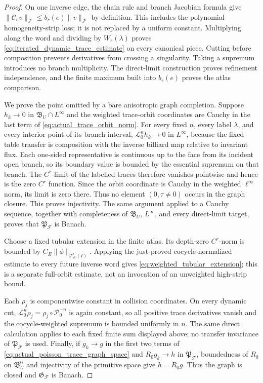 \documentclass[11pt]{amsart}
\theoremstyle{compactplain}
\theoremstyle{compactdefinition}
\theoremstyle{compactremark}
\newcommand{\Ltransfer}{\mathscr L}
\newcommand{\Pcal}{\mathcal P}
\begin{document}
\begin{proof}
On one inverse edge, the chain rule and branch Jacobian formula give
\(\|\mathcal C_ev\|_{J^r}\le b_r(e)\|v\|_{J^r}\) by definition.  This
includes the polynomial homogeneity-strip loss; it is not replaced by a
uniform constant.  Multiplying along the word and dividing by
\(W_r(\lambda)\) proves \eqref{eq:iterated_dynamic_trace_estimate} on every
canonical piece.  Cutting before composition prevents derivatives from
crossing a singularity.  Taking a supremum introduces no branch multiplicity.
The direct-limit construction proves refinement independence, and the finite
maximum built into \(b_r(e)\) proves the atlas comparison.

We prove the point omitted by a bare anisotropic graph completion.  Suppose
\(h_k\to0\) in \(\mathfrak B_U\cap L^\infty\) and the weighted trace-orbit
coordinates are Cauchy in the last term of
\eqref{eq:actual_trace_orbit_norm}.  For every fixed \(n\), every label
\(\lambda\), and every interior point of its branch interval,
\(\Ltransfer_0^nh_k\to0\) in \(L^\infty\), because the fixed-table transfer is
composition with the inverse billiard map relative to invariant flux.  Each
one-sided representative is continuous up to the face from its incident open
branch, so its boundary value is bounded by the essential supremum on that
branch.  The \(C^r\)-limit of the labelled traces therefore vanishes pointwise and hence is
the zero \(C^r\) function.  Since the orbit coordinate is Cauchy in the
weighted \(\ell^\infty\) norm, its limit is zero there.  Thus no element
\((0,\tau\ne0)\) occurs in the graph closure.  This proves injectivity.
The same argument applied to a Cauchy sequence, together with completeness of
\(\mathfrak B_U\), \(L^\infty\), and every direct-limit target, proves that
\(\mathfrak P_{\mathscr F}\) is Banach.

Choose a fixed tubular extension in the finite atlas.  Its depth-zero
\(C^r\)-norm is bounded by \(C_E\|\phi\|_{\mathcal T_K^r(I)}\).
Applying the just-proved cocycle-normalized estimate to every future inverse
word gives \eqref{eq:weighted_tubular_extension}; this is a separate full-orbit
estimate, not an invocation of an unweighted high-strip bound.

Each \(\rho_j\) is componentwise constant in collision coordinates.  On every
dynamic cut, \(\Ltransfer_0^n\rho_j=\rho_j\circ\Pcal_0^{-n}\) is again
constant, so all positive trace derivatives vanish and the cocycle-weighted
supremum is bounded uniformly in \(n\).  The same direct calculation applies
to each fixed finite sum displayed above; no transfer invariance of
\(\mathfrak P_{\mathscr F}\) is used.  Finally, if \(g_k\to g\) in the first
two terms of \eqref{eq:actual_poisson_trace_graph_space} and
\(R_0g_k\to h\) in \(\mathfrak P_{\mathscr F}\), boundedness of \(R_0\) on
\(\mathfrak B_U^0\) and injectivity of the primitive space give \(h=R_0g\).
Thus the graph is closed and \(\mathfrak G_{\mathscr F}\) is Banach.
\end{proof}
\end{document}

